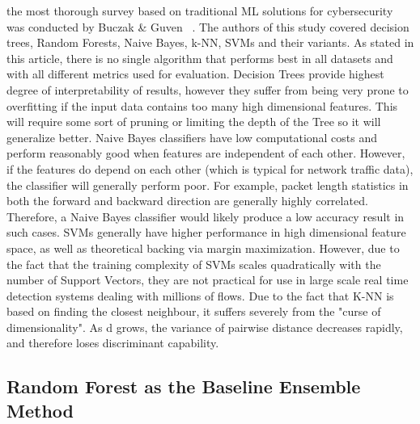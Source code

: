 the most thorough survey based on traditional ML solutions for cybersecurity was conducted by Buczak \& Guven ~\cite{buczak2016survey}. The authors of this study covered decision trees, Random Forests, Naive Bayes, k-NN, SVMs and their variants. As stated in this article, there is no single algorithm that performs best in all datasets and with all different metrics used for evaluation. Decision Trees provide highest degree of interpretability of results, however they suffer from being very prone to overfitting if the input data contains too many high dimensional features. This will require some sort of pruning or limiting the depth of the Tree so it will generalize better. Naive Bayes classifiers have low computational costs and perform reasonably good when features are independent of each other. However, if the features do depend on each other (which is typical for network traffic data), the classifier will generally perform poor. For example, packet length statistics in both the forward and backward direction are generally highly correlated. Therefore, a Naive Bayes classifier would likely produce a low accuracy result in such cases. SVMs generally have higher performance in high dimensional feature space, as well as theoretical backing via margin maximization. However, due to the fact that the training complexity of SVMs scales quadratically with the number of Support Vectors, they are not practical for use in large scale real time detection systems dealing with millions of flows. Due to the fact that K-NN is based on finding the closest neighbour, it suffers severely from the "curse of dimensionality". As d grows, the variance of pairwise distance decreases rapidly, and therefore loses discriminant capability.

\subsection{Random Forest as the Baseline Ensemble Method}

